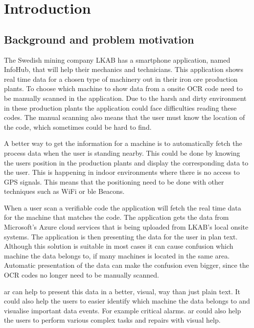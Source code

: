 \chapter{Introduction}\label{introduction}

\section{Background and problem motivation}
The Swedish mining company LKAB has a smartphone application, named InfoHub, that will help their mechanics and technicians.
This application shows real time data for a chosen type of machinery out in their iron ore production plants.
To choose which machine to show data from a onsite OCR code need to be manually scanned in the application.
Due to the harsh and dirty environment in these production plants the application could face difficulties reading these codes.
The manual scanning also means that the user must know the location of the code, which sometimes could be hard to find.

\bigskip

A better way to get the information for a machine is to automatically fetch the process data when the user is standing nearby.
This could be done by knowing the users position in the production plants and display the corresponding data to the user.
This is happening in indoor environments where there is no access to GPS signals.
This means that the positioning need to be done with other techniques such as WiFi or \acrlong{ble} Beacons.

\bigskip

When a user scan a verifiable code the application will fetch the real time data for the machine that matches the code.
The application gets the data from Microsoft's Azure cloud services that is being uploaded from LKAB's local onsite systems.
The application is then presenting the data for the user in plan text.
Although this solution is suitable in most cases it can cause confusion which machine the data belongs to, if many machines is located in the same area.
Automatic presentation of the data can make the confusion even bigger, since the OCR codes no longer need to be manually scanned.

\bigskip

\acrfull{ar} can help to present this data in a better, visual, way than just plain text.
It could also help the users to easier identify which machine the data belongs to and visualise important data events.
For example critical alarms.
\acrshort{ar} could also help the users to perform various complex tasks and repairs with visual help.

